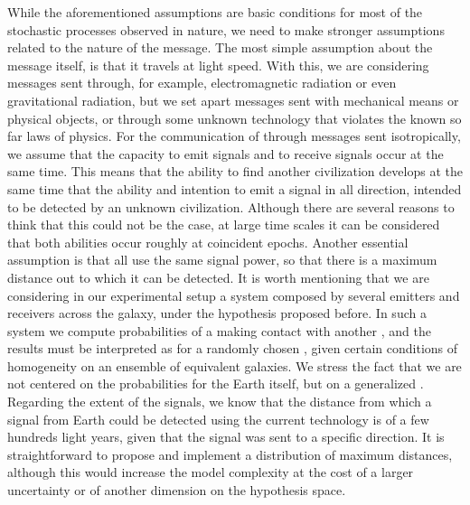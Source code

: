While the aforementioned assumptions are basic conditions for most of
the stochastic processes observed in nature, we need to make stronger
assumptions related to the nature of the message.
%
The most simple assumption about the message itself, is that it
travels at light speed.
%
With this, we are considering messages sent through, for example,
electromagnetic radiation or even gravitational radiation, but we set
apart messages sent with mechanical means or physical objects, or
through some unknown technology that violates the known so far laws of
physics.
% 
For the communication of \cetis{} through messages sent isotropically,
we assume that the capacity to emit signals and to receive signals
occur at the same time.
%
This means that the ability to find another civilization develops at
the same time that the ability and intention to emit a signal in all
direction, intended to be detected by an unknown civilization.
%
Although there are several reasons to think that this could not be the
case, at large time scales it can be considered that both abilities
occur roughly at coincident epochs.
%
Another essential assumption is that all \cetis{} use the same signal
power, so that there is a maximum distance out to which it can be
detected.
%
It is worth mentioning that we are considering in our experimental
setup a system composed by several emitters and receivers across the
galaxy, under the hypothesis proposed before.
%
In such a system we compute probabilities of a \ceti{} making contact
with another \ceti{}, and the results must be interpreted as for a
randomly chosen \ceti{}, given certain conditions of homogeneity on an
ensemble of equivalent galaxies.
%
We stress the fact that we are not centered on the probabilities for
the Earth itself, but on a generalized \ceti{}.
%
Regarding the extent of the signals, we know that the distance from
which a signal from Earth could be detected using the current
technology is of a few hundreds light years, given that the signal was
sent to a specific direction.
%
%
It is straightforward to propose and implement a distribution of
maximum distances, although this would increase the model complexity
at the cost of a larger uncertainty or of another dimension on the
hypothesis space.
%



